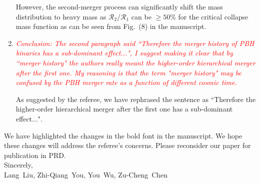\documentclass[
preprint,          %
superscriptaddress,%
amsmath,           %
amssymb,           %
aps,               %
prl,               %
notitlepage,       %
longbibliography,  %
floatfix,          %
nofootinbib,
onecolumn,
]{revtex4-1}
\newcommand{\red}[1]{\textcolor{red}{#1}}
\newcommand{\cR}{\mathcal{R}}
\begin{document}
\begin{enumerate}
However, the second-merger process can significantly shift the mass distribution to heavy mass as $\cR_2/\cR_1$ can be $\geq 50\%$ for the critical collapse mass function as can be seen from Fig.~(8) in the manuscript.

\item \red{\it Conclusion: The second paragraph said ``Therefore the merger history of PBH binaries has a sub-dominant effect...", I suggest making it clear that by ``merger history" the authors really meant the higher-order hierarchical merger after the first one. My reasoning is that the term "merger history" may be confused by the PBH merger rate as a function of different cosmic time.}

As suggested by the referee, we have rephrased the sentence as ``Therefore the higher-order hierarchical merger after the first one has a sub-dominant effect...".

\end{enumerate}

We have highlighted the changes in the bold font in the manuscript. We hope these changes will address the referee's concerns. Please reconsider our paper for publication in PRD. \\

\noindent Sincerely,\\
Lang~Liu, Zhi-Qiang~You, You~Wu, Zu-Cheng~Chen


\end{document}
